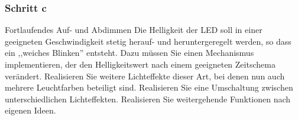 \documentclass[a4paper,12pt,titlepage]{scrartcl}
\begin{document}
\subsubsection*{Schritt c}
Fortlaufendes Auf- und Abdimmen
Die Helligkeit der LED soll in einer geeigneten Geschwindigkeit stetig herauf- und heruntergeregelt werden, so dass ein ,,weiches Blinken'' entsteht. Dazu müssen Sie einen Mechanismus implementieren, der den Helligkeitswert nach einem geeigneten Zeitschema verändert.
Realisieren Sie weitere Lichteffekte dieser Art, bei denen nun auch mehrere Leuchtfarben beteiligt sind.
Realisieren Sie eine Umschaltung zwischen unterschiedlichen Lichteffekten.
Realisieren Sie weitergehende Funktionen nach eigenen Ideen.
\end{document}

